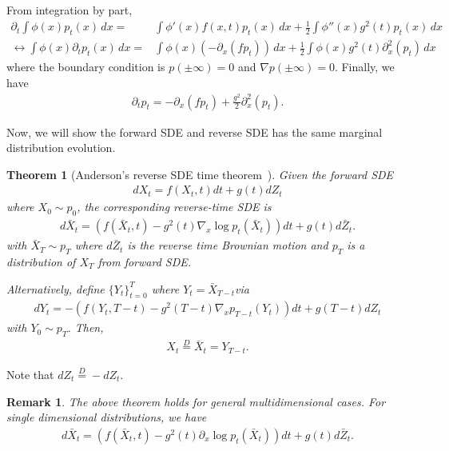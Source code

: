 \documentclass[11pt, a4paper]{article}
\newtheorem{theorem}{Theorem}
\newtheorem{remark}{Remark}
\begin{document}
From integration by part, 
\begin{align}
    \partial_t \int \phi(x) p_t(x)\, dx =& \int \phi'(x)f(x, t)p_t(x)\, dx + \frac{1}{2}\int \phi''(x)g^2(t)p_t(x)\, dx\\
    \leftrightarrow \int \phi(x) \partial_t p_t(x)\, dx =& \int \phi(x)(-\partial_x (f p_t))\, dx + \frac{1}{2}\int \phi(x)g^2(t)\partial_x^2 (p_t)\, dx
\end{align}
where the boundary condition is $p(\pm \infty)=0$ and $\nabla p(\pm \infty)=0$.
Finally, we have
\begin{align}
    \partial_t p_t = -\partial_x(fp_t) + \frac{g^2}{2}\partial_x^2 (p_t).
\end{align}

Now, we will show the forward SDE and reverse SDE has the same marginal distribution evolution.
\begin{theorem}[Anderson's reverse SDE time theorem~\cite{anderson1982reverse}]
Given the forward SDE
\begin{align}
    dX_t = f(X_t, t)dt + g(t)dZ_t
\end{align}
where $X_0\sim p_0$,
the corresponding reverse-time SDE is
\begin{align}
    d\bar{X}_t = (f(\bar{X}_t, t) - g^2(t) \nabla_x\log p_t(\bar{X}_t))dt+g(t) d\bar{Z}_t.
\end{align}
with $\bar{X}_T\sim p_T$ where $d\bar{Z}_t$ is the reverse time Brownian motion and $p_T$ is a distribution of $X_T$ from forward SDE.

Alternatively, define $\{Y_t\}_{t=0}^T$ where $Y_t= \bar{X}_{T-t}$via
\begin{align}
    dY_t =  - (f(Y_t, T-t) - g^2(T-t)\nabla_x p_{T-t}(Y_t))dt + g(T-t)dZ_t
\end{align}
with $Y_0\sim p_T$.
Then,
\begin{align}
    X_t \stackrel{D}{=} \bar{X}_t =Y_{T-t}.
\end{align}
\end{theorem}
Note that $dZ_t \stackrel{D}{=} -dZ_t$.

\begin{remark}
    The above theorem holds for general multidimensional cases.
    For single dimensional distributions, we have
\begin{align}
    d\bar{X}_t = (f(\bar{X}_t, t) - g^2(t) \partial_x\log p_t(\bar{X}_t))dt+g(t) d\bar{Z}_t.
\end{align}
\end{remark}
\end{document}
